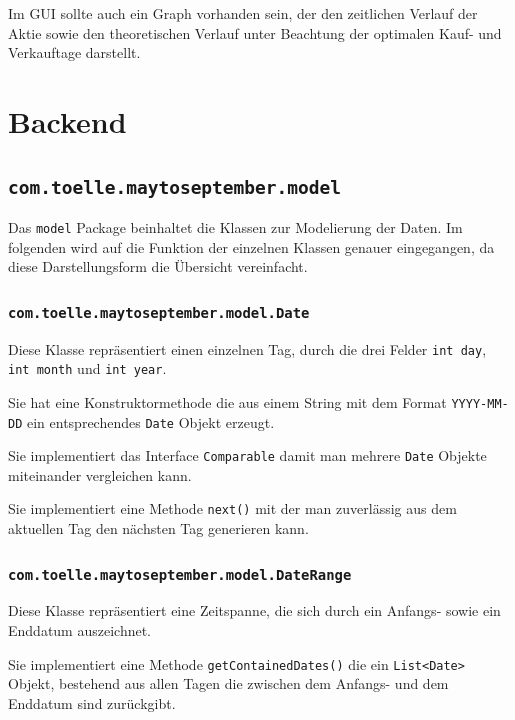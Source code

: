 \documentclass[12pt, a4paper, titlepage]{report}
\begin{document}
        		Im GUI sollte auch ein Graph vorhanden sein, der den zeitlichen Verlauf
        		der Aktie sowie den theoretischen Verlauf unter Beachtung der
        		optimalen Kauf- und Verkauftage darstellt.

        \section{Backend}
        	\subsection{\texttt{com.toelle.maytoseptember.model}}
        		Das \texttt{model} Package beinhaltet die Klassen zur Modelierung der
        		Daten. Im folgenden wird auf die Funktion der einzelnen Klassen genauer
        		eingegangen, da diese Darstellungsform die Übersicht vereinfacht.
        		
        		\subsubsection{\texttt{com.toelle.maytoseptember.model.Date}}
        		Diese Klasse repräsentiert einen einzelnen Tag, durch die drei
        		Felder \texttt{int day}, \texttt{int month} und \texttt{int year}.
        		
        		Sie hat eine Konstruktormethode die aus einem String mit dem Format
        		\texttt{YYYY-MM-DD} ein entsprechendes \texttt{Date} Objekt erzeugt.
        		
        		Sie implementiert das Interface \texttt{Comparable} damit man mehrere
        		\texttt{Date} Objekte miteinander vergleichen kann.
        		
        		Sie implementiert eine Methode \texttt{next()} mit der man zuverlässig
        		aus dem aktuellen Tag den nächsten Tag generieren kann.
        		
        		\subsubsection{\texttt{com.toelle.maytoseptember.model.DateRange}}
        		Diese Klasse repräsentiert eine Zeitspanne, die sich durch ein Anfangs-
        		sowie ein Enddatum auszeichnet.
        		
        		Sie implementiert eine Methode \texttt{getContainedDates()} die
        		ein \texttt{List<Da\allowbreak te>} Objekt, bestehend aus allen Tagen die zwischen
        		dem Anfangs- und dem Enddatum sind zurückgibt.
        		
\end{document}
